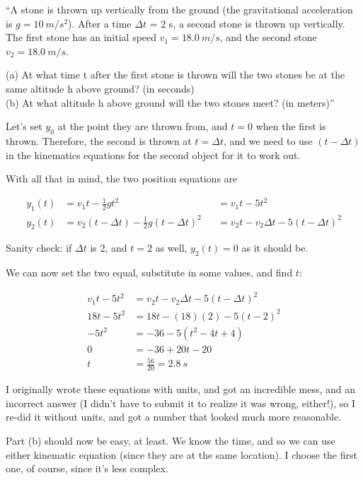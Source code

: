 \documentclass[8.01x]{subfiles}
\begin{document}
``A stone is thrown up vertically from the ground (the gravitational acceleration is $g = \SI{10}{m/s^2}$). After a time $\Delta t$ = 2 s, a second stone is thrown up vertically. The first stone has an initial speed $v_1 = \SI{18.0}{m/s}$, and the second stone $v_2 = \SI{18.0}{m/s}$.

(a) At what time t after the first stone is thrown will the two stones be at the same altitude h above ground? (in seconds)\\
(b) At what altitude h above ground will the two stones meet? (in meters)''

Let's set $y_0$ at the point they are thrown from, and $t = 0$ when the first is thrown. Therefore, the second is thrown at $t = \Delta t$, and we need to use $(t - \Delta t)$ in the kinematics equations for the second object for it to work out.

With all that in mind, the two position equations are

\begin{align}
y_1(t) &= v_1 t - \frac{1}{2} g t^2 &&= v_1 t - 5 t^2\\
y_2(t) &= v_2 (t - \Delta t) - \frac{1}{2} g (t - \Delta t)^2 &&= v_2 t - v_2 \Delta t - 5(t - \Delta t)^2
\end{align}

Sanity check: if $\Delta t$ is 2, and $t = 2$ as well, $y_2(t) = 0$ as it should be.

We can now set the two equal, substitute in some values, and find $t$:

\begin{align}
v_1 t - 5 t^2 &= v_2 t - v_2 \Delta t - 5(t - \Delta t)^2\\
18 t - 5 t^2 &= 18 t - (18)(2) - 5(t - 2)^2\\
- 5 t^2 &= - 36 - 5(t^2 - 4t + 4)\\
0 &= - 36 + 20t - 20\\
t &= \frac{56}{20} = \SI{2.8}{s}
\end{align}

I originally wrote these equations with units, and got an incredible mess, and an incorrect answer (I didn't have to submit it to realize it was wrong, either!), so I re-did it without units, and got a number that looked much more reasonable.

Part (b) should now be easy, at least. We know the time, and so we can use either kinematic equation (since they are at the same location). I choose the first one, of course, since it's less complex.
\end{document}

